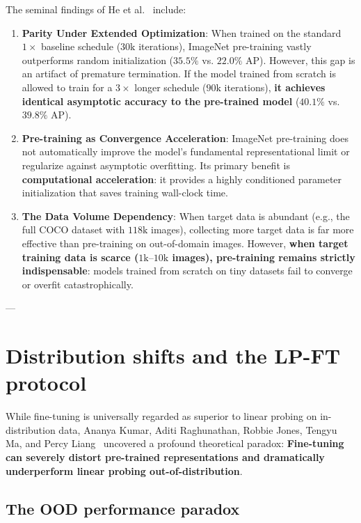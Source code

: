 The seminal findings of He et al.~\cite{he2019rethinking} include:
\begin{enumerate}[leftmargin=*]
  \item \textbf{Parity Under Extended Optimization}:
    When trained on the standard $1\times$ baseline schedule ($30\text{k}$ iterations), ImageNet pre-training vastly outperforms random initialization ($35.5\%$ vs. $22.0\%$ AP). However, this gap is an artifact of premature termination. If the model trained from scratch is allowed to train for a $3\times$ longer schedule ($90\text{k}$ iterations), \textbf{it achieves identical asymptotic accuracy to the pre-trained model} ($40.1\%$ vs. $39.8\%$ AP).
  \item \textbf{Pre-training as Convergence Acceleration}:
    ImageNet pre-training does not automatically improve the model's fundamental representational limit or regularize against asymptotic overfitting. Its primary benefit is \textbf{computational acceleration}: it provides a highly conditioned parameter initialization that saves training wall-clock time.
  \item \textbf{The Data Volume Dependency}:
    When target data is abundant (e.g., the full COCO dataset with $118\text{k}$ images), collecting more target data is far more effective than pre-training on out-of-domain images. 
    However, \textbf{when target training data is scarce ($1\text{k}\text{--}10\text{k}$ images), pre-training remains strictly indispensable}: models trained from scratch on tiny datasets fail to converge or overfit catastrophically.
\end{enumerate}

---

\section{Distribution shifts and the LP-FT protocol}
\label{sec:feature_distortion_lp_ft}

While fine-tuning is universally regarded as superior to linear probing on in-distribution data, Ananya Kumar, Aditi Raghunathan, Robbie Jones, Tengyu Ma, and Percy Liang~\cite{kumar2022fine} uncovered a profound theoretical paradox: \textbf{Fine-tuning can severely distort pre-trained representations and dramatically underperform linear probing out-of-distribution}.

\subsection{The OOD performance paradox}
\label{sec:id_vs_ood_paradox}

